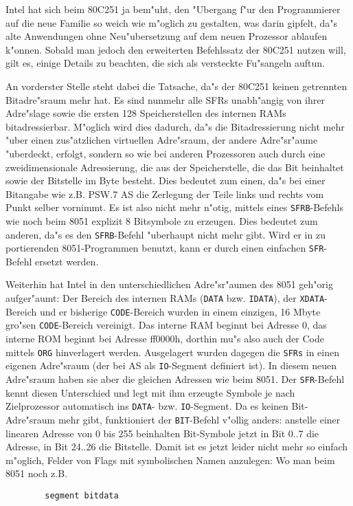 \documentclass[12pt,a4paper,twoside]{report}
\newcommand{\tty}[1]{{\tt #1}}
\begin{document}
{Intel hat sich beim 80C251 ja bem"uht, den "Ubergang f"ur den Programmierer
auf die neue Familie so weich wie m"oglich zu gestalten, was darin gipfelt,
da"s alte Anwendungen ohne Neu"ubersetzung auf dem neuen Prozessor ablaufen
k"onnen.  Sobald man jedoch den erweiterten Befehlssatz der 80C251 nutzen
will, gilt es, einige Details zu beachten, die sich als versteckte
Fu"sangeln auftun.
\par
An vorderster Stelle steht dabei die Tatsache, da"s der 80C251 keinen
getrennten Bitadre"sraum mehr hat.  Es sind nunmehr alle SFRs unabh"angig
von ihrer Adre"slage sowie die ersten 128 Speicherstellen des internen
RAMs bitadressierbar.  M"oglich wird dies dadurch, da"s die Bitadressierung
nicht mehr "uber einen zus"atzlichen virtuellen Adre"sraum, der andere
Adre"sr"aume "uberdeckt, erfolgt, sondern so wie bei anderen Prozessoren
auch durch eine zweidimensionale Adressierung, die aus der Speicherstelle,
die das Bit beinhaltet sowie der Bitstelle im Byte besteht.  Dies bedeutet
zum einen, da"s bei einer Bitangabe wie z.B. PSW.7 AS die Zerlegung der
Teile links und rechts vom Punkt selber vornimmt.  Es ist also nicht mehr
n"otig, mittels eines \tty{SFRB}-Befehls wie noch beim 8051 explizit 8
Bitsymbole zu erzeugen.  Dies bedeutet zum anderen, da"s es den
\tty{SFRB}-Befehl "uberhaupt nicht mehr gibt.  Wird er in zu portierenden
8051-Programmen benutzt, kann er durch einen einfachen \tty{SFR}-Befehl
ersetzt werden.
\par
Weiterhin hat Intel in den unterschiedlichen Adre"sr"aumen des 8051
geh"orig aufger"aumt: Der Bereich des internen RAMs (\tty{DATA} bzw.
\tty{IDATA}), der \tty{XDATA}-Bereich und er bisherige \tty{CODE}-Bereich
wurden in einem einzigen, 16 Mbyte gro"sen \tty{CODE}-Bereich vereinigt.
Das interne RAM beginnt bei Adresse 0, das interne ROM beginnt bei
Adresse ff0000h, dorthin mu"s also auch der Code mittels \tty{ORG}
hinverlagert werden.  Ausgelagert wurden dagegen die \tty{SFRs} in einen
eigenen Adre"sraum (der bei AS als \tty{IO}-Segment definiert ist).  In
diesem neuen Adre"sraum haben sie aber die gleichen Adressen wie beim 8051.
Der \tty{SFR}-Befehl kennt diesen Unterschied und legt mit ihm erzeugte
Symbole je nach Zielprozessor automatisch ins \tty{DATA}- bzw.
\tty{IO}-Segment.  Da es keinen Bit-Adre"sraum mehr gibt, funktioniert der
\tty{BIT}-Befehl v"ollig anders: anstelle einer linearen Adresse von 0 bis
255 beinhalten Bit-Symbole jetzt in Bit 0..7 die Adresse, in Bit 24..26
die Bitstelle.  Damit ist es jetzt leider nicht mehr so einfach m"oglich,
Felder von Flags mit symbolischen Namen anzulegen: Wo man beim 8051 noch
z.B.
\begin{verbatim}
        segment bitdata


\end{verbatim}}
\end{document}
